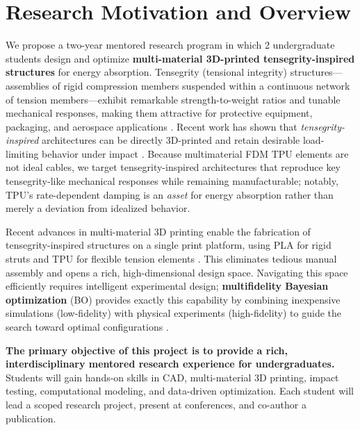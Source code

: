 \documentclass[11pt]{article}
\begin{document}


\section{Research Motivation and Overview}

We propose a two-year mentored research program in which 2 undergraduate
students design and optimize \textbf{multi-material 3D-printed
tensegrity-inspired structures} for energy absorption.  Tensegrity (tensional
integrity) structures---assemblies of rigid compression members suspended within
a continuous network of tension members---exhibit remarkable strength-to-weight
ratios and tunable mechanical responses, making them attractive for protective
equipment, packaging, and aerospace applications
\citep{skelton2009tensegrity, fraternali2015tensegrity}.
Recent work has shown that \emph{tensegrity-inspired} architectures can be
directly 3D-printed and retain desirable load-limiting behavior under impact
\citep{pajunen2019design}.  Because multimaterial FDM TPU elements are not
ideal cables, we target tensegrity-inspired architectures that reproduce key
tensegrity-like mechanical responses while remaining manufacturable; notably,
TPU's rate-dependent damping is an \emph{asset} for energy absorption rather
than merely a deviation from idealized behavior.

Recent advances in multi-material 3D printing enable the fabrication of
tensegrity-inspired structures on a single print platform, using PLA for rigid
struts and TPU for flexible tension elements
\citep{ye2023multimaterial, khatri2024energy}.  This eliminates tedious manual
assembly and opens a rich, high-dimensional design space.  Navigating this space
efficiently requires intelligent experimental design; \textbf{multifidelity
Bayesian optimization} (BO) provides exactly this capability by combining
inexpensive simulations (low-fidelity) with physical experiments (high-fidelity)
to guide the search toward optimal configurations
\citep{mo2023accelerated, perdikaris2017nonlinear}.

\textbf{The primary objective of this project is to provide a rich,
interdisciplinary mentored research experience for undergraduates.}  Students
will gain hands-on skills in CAD, multi-material 3D printing, impact testing,
computational modeling, and data-driven optimization.  Each student will lead a
scoped research project, present at conferences, and co-author a publication.
\end{document}
